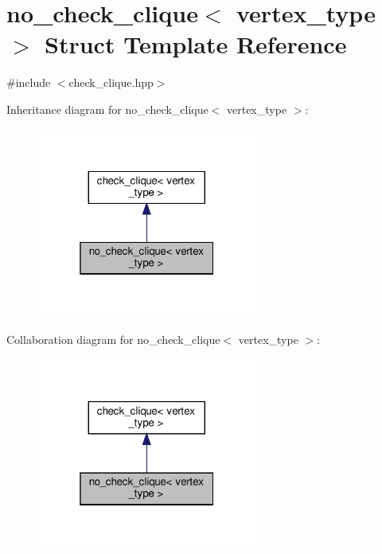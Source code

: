 \hypertarget{structno__check__clique}{}\section{no\+\_\+check\+\_\+clique$<$ vertex\+\_\+type $>$ Struct Template Reference}
\label{structno__check__clique}


{\ttfamily \#include $<$check\+\_\+clique.\+hpp$>$}



Inheritance diagram for no\+\_\+check\+\_\+clique$<$ vertex\+\_\+type $>$\+:
\nopagebreak
\begin{figure}[H]
\begin{center}
\leavevmode
\includegraphics[width=205pt]{d9/de5/structno__check__clique__inherit__graph}
\end{center}
\end{figure}


Collaboration diagram for no\+\_\+check\+\_\+clique$<$ vertex\+\_\+type $>$\+:
\nopagebreak
\begin{figure}[H]
\begin{center}
\leavevmode
\includegraphics[width=205pt]{dc/db7/structno__check__clique__coll__graph}
\end{center}
\end{figure}
